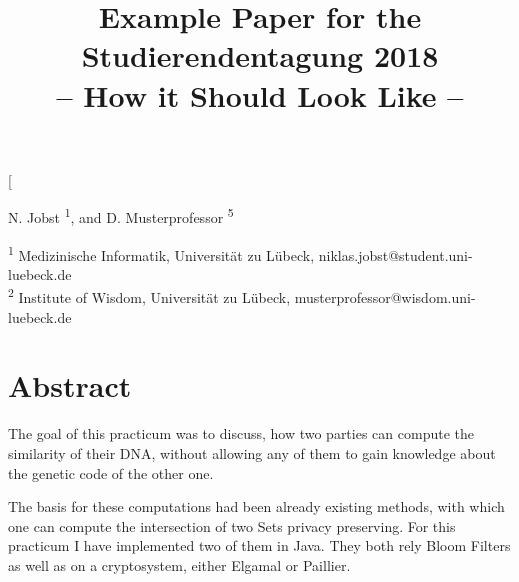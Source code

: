 \documentclass[10pt,a4paper,oneside,twocolumn]{article}
\makeatletter
\newcommand{\authorfootnotes}{\renewcommand\thefootnote{\@fnsymbol\c@footnote}}
\makeatother
\begin{document}
\thispagestyle{empty}
\parindent 0pt %
\twocolumn[


\title{\textbf{Example Paper for the Studierendentagung 2018 \\-- How it Should Look Like --}}

\date{}
\maketitle

\vspace*{-6mm}
\authorfootnotes

{\fontsize{10pt}{1em} \selectfont


 
N. Jobst \textsuperscript{1}, and
D. Musterprofessor \textsuperscript{5} \vspace*{1mm}

\textsuperscript{1} Medizinische Informatik, Universität zu Lübeck, niklas.jobst@student.uni-luebeck.de\\
\textsuperscript{2} Institute of Wisdom, Universität zu Lübeck, musterprofessor@wisdom.uni-luebeck.de\\
}
\vspace*{-2mm}  


\section*{Abstract} 

The goal of this practicum was to discuss, how two parties can compute the similarity of their DNA, without allowing any of them to gain knowledge about the genetic code of the other one. 

The basis for these computations had been already existing methods, with which one can compute the intersection of two Sets privacy preserving.
For this practicum I have implemented two of them in Java.
They both rely Bloom Filters as well as on a cryptosystem, either Elgamal or Paillier. 
\end{document}

